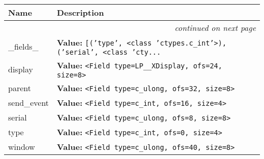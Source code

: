     \vspace{-1cm}
\hspace{\varindent}\begin{longtable}{|p{\varnamewidth}|p{\vardescrwidth}|l}
\cline{1-2}
\cline{1-2} \centering \textbf{Name} & \centering \textbf{Description}& \\
\cline{1-2}
\endhead\cline{1-2}\multicolumn{3}{r}{\small\textit{continued on next page}}\\\endfoot\cline{1-2}
\endlastfoot\raggedright \_\-f\-i\-e\-l\-d\-s\-\_\- & \raggedright \textbf{Value:} 
{\tt \texttt{[}\texttt{(}\texttt{'}\texttt{type}\texttt{'}\texttt{, }{\textless}class 'ctypes.c\_int'{\textgreater}\texttt{)}\texttt{, }\texttt{(}\texttt{'}\texttt{serial}\texttt{'}\texttt{, }{\textless}class 'cty\texttt{...}}&\\
\cline{1-2}
\raggedright d\-i\-s\-p\-l\-a\-y\- & \raggedright \textbf{Value:} 
{\tt {\textless}Field type=LP\_\_XDisplay, ofs=24, size=8{\textgreater}}&\\
\cline{1-2}
\raggedright p\-a\-r\-e\-n\-t\- & \raggedright \textbf{Value:} 
{\tt {\textless}Field type=c\_ulong, ofs=32, size=8{\textgreater}}&\\
\cline{1-2}
\raggedright s\-e\-n\-d\-\_\-e\-v\-e\-n\-t\- & \raggedright \textbf{Value:} 
{\tt {\textless}Field type=c\_int, ofs=16, size=4{\textgreater}}&\\
\cline{1-2}
\raggedright s\-e\-r\-i\-a\-l\- & \raggedright \textbf{Value:} 
{\tt {\textless}Field type=c\_ulong, ofs=8, size=8{\textgreater}}&\\
\cline{1-2}
\raggedright t\-y\-p\-e\- & \raggedright \textbf{Value:} 
{\tt {\textless}Field type=c\_int, ofs=0, size=4{\textgreater}}&\\
\cline{1-2}
\raggedright w\-i\-n\-d\-o\-w\- & \raggedright \textbf{Value:} 
{\tt {\textless}Field type=c\_ulong, ofs=40, size=8{\textgreater}}&\\
\cline{1-2}
\end{longtable}



